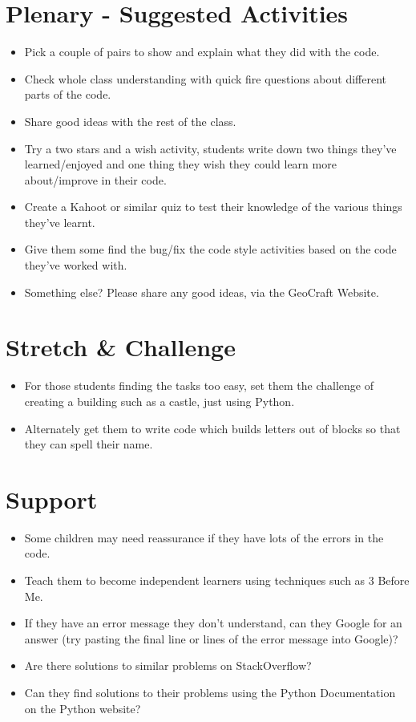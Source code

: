 \documentclass{geocraft-lesson-plan}
\begin{document}
\section*{Plenary - Suggested Activities}
\begin{itemize}
\item Pick a couple of pairs to show and explain what they did with the code. 
\item Check whole class understanding with quick fire questions about different parts of the code. 
\item Share good ideas with the rest of the class.
\item Try a two stars and a wish activity, students write down two things they've learned/enjoyed and one thing they
  wish they could learn more about/improve in their code.
\item Create a Kahoot or similar quiz to test their knowledge of the various things they've learnt.
\item Give them some find the bug/fix the code style activities based on the code they've worked with.
\item Something else? Please share any good ideas, via the GeoCraft Website.
\end{itemize}


\section*{Stretch \& Challenge}
\begin{itemize}
\item For those students finding the tasks too easy, set them the challenge of creating a building such as a castle,
  just using Python.
\item Alternately get them to write code which builds letters out of blocks so that they can spell their name.
\end{itemize}

\section*{Support}
\begin{itemize}
\item Some children may need reassurance if they have lots of the errors in the code.
\item Teach them to become independent learners using techniques such as 3 Before Me.
\item If they have an error message they don't understand, can they Google for an answer (try pasting the final line or
  lines of the error message into Google)?  
\item Are there solutions to similar problems on StackOverflow?
\item Can they find solutions to their problems using the Python Documentation on the Python website?
\end{itemize}
\end{document}
